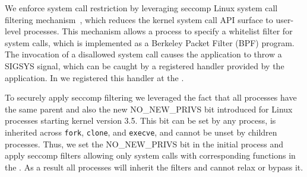 We enforce system call restriction by leveraging seccomp Linux system
call filtering mechanism~\citep{seccomp}, which reduces the kernel
system call API surface to user-level processes. This mechanism allows
a process to specify a whitelist filter for system calls, which is
implemented as a Berkeley Packet Filter (BPF) program. The invocation
of a disallowed system call causes the application to throw a SIGSYS
signal, which can be caught by a registered handler provided by the
application. In \sysname{} we registered this handler at the \pal{}.

To securely apply seccomp filtering we leveraged the fact that all
\sysname{} processes have the same parent and also the new
NO\_NEW\_PRIVS bit introduced for Linux processes starting kernel
version 3.5. This bit can be set by any process, is inherited across
{\tt fork}, {\tt clone}, and {\tt execve}, and cannot be unset by
children processes. Thus, we set the NO\_NEW\_PRIVS bit in the initial
\sysname{} process and apply seccomp filters allowing only system calls
with corresponding functions in the \pal{}. As a result all \sysname{}
processes will inherit the filters and cannot relax or bypass it.



